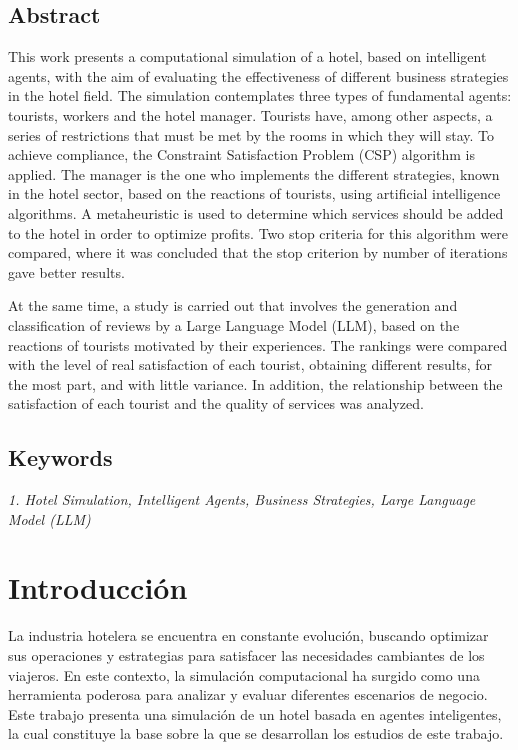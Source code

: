 \documentclass[12pt,a4paper]{article} \usepackage[spanish]{babel} \usepackage{graphicx} \usepackage{amsmath} \usepackage{amsfonts} \usepackage{amssymb} \usepackage{float} \usepackage{geometry}
\begin{document}
\subsection*{Abstract} This work presents a computational simulation of a hotel, based on intelligent agents, with the aim of evaluating the effectiveness of different business strategies in the hotel field. The simulation contemplates three types of fundamental agents: tourists, workers and the hotel manager. Tourists have, among other aspects, a series of restrictions that must be met by the rooms in which they will stay. To achieve compliance, the Constraint Satisfaction Problem (CSP) algorithm is applied. The manager is the one who implements the different strategies, known in the hotel sector, based on the reactions of tourists, using artificial intelligence algorithms. A metaheuristic is used to determine which services should be added to the hotel in order to optimize profits. Two stop criteria for this algorithm were compared, where it was concluded that the stop criterion by number of iterations gave better results. 

At the same time, a study is carried out that involves the generation and classification of reviews by a Large Language Model (LLM), based on the reactions of tourists motivated by their experiences. The rankings were compared with the level of real satisfaction of each tourist, obtaining different results, for the most part, and with little variance. In addition, the relationship between the satisfaction of each tourist and the quality of services was analyzed.

\subsection*{Keywords}\textit{1. Hotel Simulation, Intelligent Agents, Business Strategies, Large Language Model (LLM)}

\vspace{-1em} \hrulefill

\section{Introducción}

La industria hotelera se encuentra en constante evolución, buscando optimizar sus operaciones y estrategias para satisfacer las necesidades cambiantes de los viajeros. En este contexto, la simulación computacional ha surgido como una herramienta poderosa para analizar y evaluar diferentes escenarios de negocio. Este trabajo presenta una simulación de un hotel basada en agentes inteligentes, la cual constituye la base sobre la que se desarrollan los estudios de este trabajo.
\end{document}
